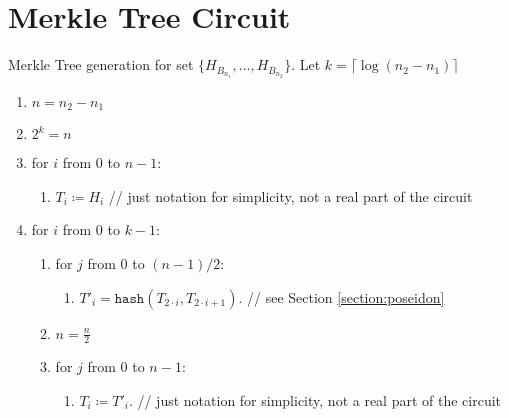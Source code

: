 \section{Merkle Tree Circuit}
\label{section:merkle}

Merkle Tree generation for set $\{H_{B_{n_1}}, ..., H_{B_{n_2}}\}$.
Let $k = \lceil \log(n_2 - n_1) \rceil$

\begin{enumerate}
	\item $n = n_2 - n_1$
	\item $2^k = n$
	\item for $i$ from $0$ to $n - 1$:
	\begin{enumerate}
		\item $T_i \coloneqq H_i$ // just notation for simplicity, not a real part of the circuit
	\end{enumerate}
	\item for $i$ from $0$ to $k - 1$:
	\begin{enumerate}
		\item for $j$ from $0$ to $(n - 1) / 2$:
		\begin{enumerate}
			\item $T'_i = \texttt{hash}(T_{2 \cdot  i}, T_{2 \cdot i + 1})$. // see Section \ref{section:poseidon}
		\end{enumerate}
		\item $n = \frac{n}{2}$
		\item for $j$ from $0$ to $n - 1$:
		\begin{enumerate}
			\item $T_i \coloneqq T'_i$. // just notation for simplicity, not a real part of the circuit
		\end{enumerate}
	\end{enumerate}
\end{enumerate}